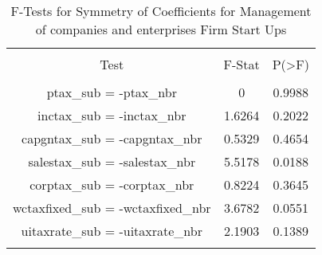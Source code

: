 
\begin{table}[!htbp] \centering 
  \caption{F-Tests for Symmetry of Coefficients for Management of companies and enterprises Firm Start Ups} 
  \label{55Ftests} 
\begin{tabular}{@{\extracolsep{5pt}} ccc} 
\\[-1.8ex]\hline 
\hline \\[-1.8ex] 
Test & F-Stat & P(\textgreater F) \\ 
\hline \\[-1.8ex] 
ptax\_sub = -ptax\_nbr & 0 & 0.9988 \\ 
inctax\_sub = -inctax\_nbr & 1.6264 & 0.2022 \\ 
capgntax\_sub = -capgntax\_nbr & 0.5329 & 0.4654 \\ 
salestax\_sub = -salestax\_nbr & 5.5178 & 0.0188 \\ 
corptax\_sub = -corptax\_nbr & 0.8224 & 0.3645 \\ 
wctaxfixed\_sub = -wctaxfixed\_nbr & 3.6782 & 0.0551 \\ 
uitaxrate\_sub = -uitaxrate\_nbr & 2.1903 & 0.1389 \\ 
\hline \\[-1.8ex] 
\end{tabular} 
\end{table} 

